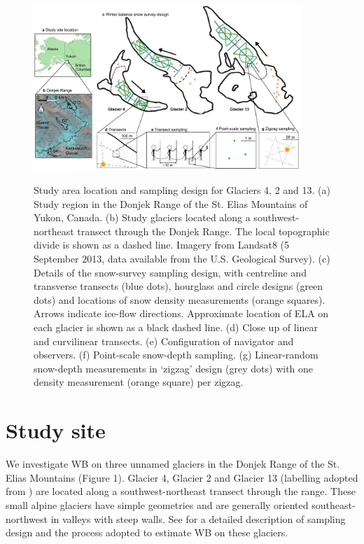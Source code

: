 \documentclass[twocolumn, letterpaper]{igs}
\begin{document}
\begin{figure}
	\centering
	\includegraphics[width =0.9\textwidth]{Sampling.pdf}\\
	\caption{Study area location and sampling design for Glaciers 4, 2 and 13. (a) Study region in the Donjek Range of the St. Elias Mountains of Yukon, Canada. (b) Study glaciers located along a southwest-northeast transect through the Donjek Range. The local topographic divide is shown as a dashed line. Imagery from Landsat8 (5 September 2013, data available from the U.S. Geological Survey). (c) Details of the snow-survey sampling design, with centreline and transverse transects (blue dots), hourglass and circle designs (green dots) and locations of snow density measurements (orange squares). Arrows indicate ice-flow directions. Approximate location of ELA on each glacier is shown as a black dashed line. (d) Close up of linear and curvilinear transects. (e) Configuration of navigator and observers. (f) Point-scale snow-depth sampling. (g) Linear-random snow-depth measurements in `zigzag' design (grey dots) with one density measurement (orange square) per zigzag.}
	\label{fig:Sampling}
\end{figure}

\section{Study site}

We investigate WB on three unnamed glaciers in the Donjek Range of the St. Elias Mountains (Figure 1). Glacier 4, Glacier 2 and Glacier 13 (labelling adopted from \cite{Crompton2016}) are located along a southwest-northeast transect through the range. These small alpine glaciers have simple geometries and are generally oriented southeast-northwest in valleys with steep walls. See \cite{Pulwicki2017} for a detailed description of sampling design and the process adopted to estimate WB on these glaciers. 
\end{document}
